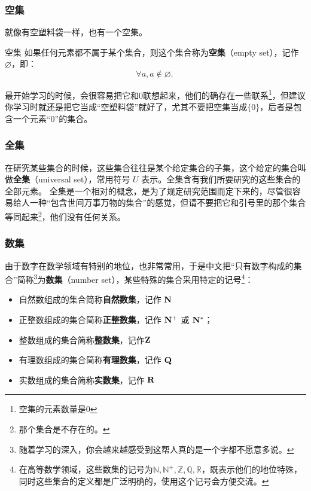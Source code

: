 \subsubsection{空集}

就像有空塑料袋一样，也有一个空集。

\begin{definition}{空集}
如果任何元素都不属于某个集合，则这个集合称为\textbf{空集}（empty set），记作 $\varnothing$，即：
\begin{equation}
\forall a,a\notin\varnothing.~
\end{equation}
\end{definition}

最开始学习的时候，会很容易把它和$0$联想起来，他们的确存在一些联系\footnote{空集的元素数量是0}，但建议你学习时就还是把它当成“空塑料袋”就好了，尤其不要把空集当成$\{0\}$，后者是包含一个元素“$0$”的集合。

\subsubsection{全集}

在研究某些集合的时候，这些集合往往是某个给定集合的子集，这个给定的集合叫做\textbf{全集}（universal set），常用符号 $U$ 表示。全集含有我们所要研究的这些集合的全部元素。
全集是一个相对的概念，是为了规定研究范围而定下来的，尽管很容易给人一种“包含世间万事万物的集合”的感觉，但请不要把它和引号里的那个集合等同起来\footnote{那个集合是不存在的。}，他们没有任何关系。

\subsubsection{数集}

由于数字在数学领域有特别的地位，也非常常用，于是中文把“只有数字构成的集合”简称\footnote{随着学习的深入，你会越来越感受到这帮人真的是一个字都不愿意多说。}为\textbf{数集}（number set），某些特殊的集合采用特定的记号\footnote{在高等数学领域，这些数集的记号为$\mathbb{N,N^+,Z,Q,R}$，既表示他们的地位特殊，同时这些集合的定义都是广泛明确的，使用这个记号会方便交流。}：
\begin{itemize}
\item 自然数组成的集合简称\textbf{自然数集}，记作 ${\rm \mathbf{N}}$
\item 正整数组成的集合简称\textbf{正整数集}，记作 ${\rm \mathbf{N^+}}$ 或 ${\rm \mathbf{N^*}}$； 
\item 整数组成的集合简称\textbf{整数集}，记作${\rm \mathbf{Z}}$
\item 有理数组成的集合简称\textbf{有理数集}，记作 ${\rm \mathbf{Q}}$
\item 实数组成的集合简称\textbf{实数集}，记作 ${\rm \mathbf{R}}$
\end{itemize}

